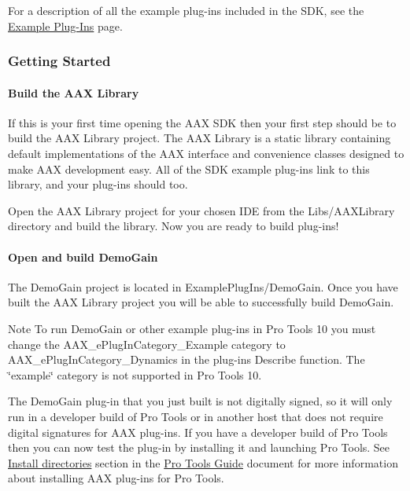  For a description of all the example plug-\/ins included in the S\+D\+K, see the \hyperlink{a00376}{Example Plug-\/\+Ins} page.

\hypertarget{a00324_subsection__getting_started_with_demogain}{}\subsubsection{Getting Started}\label{a00324_subsection__getting_started_with_demogain}
\hypertarget{a00324_subsubsection__build_the_aax_library}{}\paragraph{Build the A\+A\+X Library}\label{a00324_subsubsection__build_the_aax_library}
If this is your first time opening the A\+A\+X S\+D\+K then your first step should be to build the A\+A\+X Library project. The A\+A\+X Library is a static library containing default implementations of the A\+A\+X interface and convenience classes designed to make A\+A\+X development easy. All of the S\+D\+K example plug-\/ins link to this library, and your plug-\/ins should too.

Open the A\+A\+X Library project for your chosen I\+D\+E from the Libs/\+A\+A\+X\+Library directory and build the library. Now you are ready to build plug-\/ins!

\hypertarget{a00324_subsubsection__open_demogain}{}\paragraph{Open and build Demo\+Gain}\label{a00324_subsubsection__open_demogain}
The Demo\+Gain project is located in Example\+Plug\+Ins/\+Demo\+Gain. Once you have built the A\+A\+X Library project you will be able to successfully build Demo\+Gain.

\begin{DoxyNote}{Note}
To run Demo\+Gain or other example plug-\/ins in Pro Tools 10 you must change the {\ttfamily A\+A\+X\+\_\+e\+Plug\+In\+Category\+\_\+\+Example} category to {\ttfamily A\+A\+X\+\_\+e\+Plug\+In\+Category\+\_\+\+Dynamics} in the plug-\/in\textquotesingle{}s Describe function. The \char`\"{}example\char`\"{} category is not supported in Pro Tools 10.
\end{DoxyNote}
The Demo\+Gain plug-\/in that you just built is not digitally signed, so it will only run in a developer build of Pro Tools or in another host that does not require digital signatures for A\+A\+X plug-\/ins. If you have a developer build of Pro Tools then you can now test the plug-\/in by installing it and launching Pro Tools. See \hyperlink{a00360_subsection__install_directories_}{Install directories} section in the \hyperlink{a00360}{Pro Tools Guide} document for more information about installing A\+A\+X plug-\/ins for Pro Tools.

